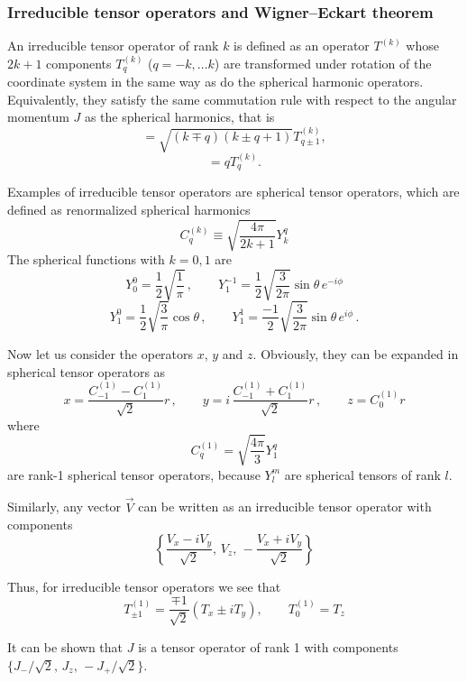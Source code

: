 \documentclass[a4paper,oneside,12pt]{extarticle}
\begin{document}
\subsubsection {Irreducible tensor operators and Wigner–Eckart theorem}
%
An irreducible tensor operator of rank $k$ is defined as an operator $T^{(k)}$ whose $2k+1$ components $T_q^{(k)}$ ($q=-k,\ldots k$) are transformed under rotation of the coordinate system in the same way as do the spherical harmonic operators. Equivalently, they satisfy the same commutation rule with respect to the angular momentum $J$ as the spherical harmonics, that is
\begin{equation}
[J_{\pm}, T_q^{(k)}] = \sqrt{(k\mp q)(k \pm q + 1)} T_{q\pm 1}^{(k)},
\end{equation}
\begin{equation}
[J_z, T_q^{(k)}] = q T_{q}^{(k)}.
\end{equation}

Examples of irreducible tensor operators are spherical tensor operators, which are defined as renormalized spherical harmonics
$$
C_q^{(k)} \equiv \sqrt{\frac{4\pi}{2k+1}} Y_k^q
$$
%
The spherical functions with $k=0,1$ are
$$
Y_0^0 = \frac{1}{2} \sqrt{\frac{1}{\pi}} \,, \qquad
Y_1^{-1} = \frac{1}{2} \sqrt{\frac{3}{2\pi}} \sin\theta \, e^{-i \phi}
$$
$$
Y_1^{0} = \frac{1}{2} \sqrt{\frac{3}{\pi}} \cos\theta \,, \qquad
Y_1^{1} = \frac{-1}{2} \sqrt{\frac{3}{2\pi}} \sin\theta \, e^{i \phi} \,.
$$

Now let us consider the operators $x$, $y$ and $z$. 
Obviously, they can be expanded in spherical tensor operators as
%
$$
x = \frac{C_{-1}^{(1)} - C_{1}^{(1)}}{\sqrt{2}} r \,,\qquad 
y = i\, \frac{C_{-1}^{(1)} + C_{1}^{(1)}}{\sqrt{2}} r  \,,\qquad
z = C_{0}^{(1)} r
$$
%
where
$$
C_{q}^{(1)} = \sqrt{\frac{4\pi}{3}} Y_1^{q}
$$
are rank-1 spherical tensor operators, because $Y_l^{m}$ are spherical tensors of rank $l$.

Similarly, any vector $\vec{V}$ can be written as an irreducible tensor operator with components
$$
\left\{ \frac{V_x-iV_y}{\sqrt{2}},\, V_z,\, -\frac{V_x+iV_y}{\sqrt{2}} \right\}
$$

Thus, for irreducible tensor operators we see that
\begin{equation}
T_{\pm 1}^{(1)} = \frac{\mp 1}{\sqrt{2}} (T_x \pm i T_y), \qquad T_{0}^{(1)} = T_z
\end{equation}

It can be shown that $J$ is a tensor operator of rank 1 with components $\{ J_-/\sqrt{2},\, J_z,\, -J_+/\sqrt{2}\}$.
\end{document}
